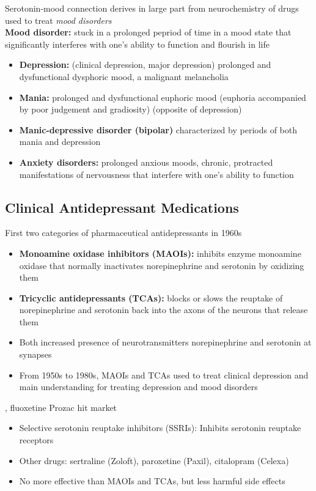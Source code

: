 \documentclass{article}
\begin{document}
Serotonin-mood connection derives in large part from neurochemistry of drugs used to treat \textit{mood disorders} \\

\noindent \textbf{Mood disorder:} stuck in a prolonged pepriod of time in a mood state that significantly interferes with one's ability to function and flourish in life 

\begin{itemize}
    \item \textbf{Depression:} (clinical depression, major depression) prolonged and dysfunctional dysphoric mood, a malignant melancholia
    \item \textbf{Mania:} prolonged and dysfunctional euphoric mood (euphoria accompanied by poor judgement and gradiosity) (opposite of depression) 
    \item \textbf{Manic-depressive disorder (bipolar)} characterized by periods of both mania and depression
    \item \textbf{Anxiety disorders:} prolonged anxious moods, chronic, protracted manifestations of nervousness that interfere with one's ability to function
\end{itemize}

\subsection{Clinical Antidepressant Medications}
First two categories of pharmaceutical antidepressants in 1960s
\begin{itemize}
    \item \textbf{Monoamine oxidase inhibitors (MAOIs):} inhibits enzyme monoamine oxidase that normally inactivates norepinephrine and serotonin by oxidizing them 
    \item \textbf{Tricyclic antidepressants (TCAs):} blocks or slows the reuptake of norepinephrine and serotonin back into the axons of the neurons that release them 
    \item Both increased presence of neurotransmitters norepinephrine and serotonin at synapses
    \item From 1950s to 1980s, MAOIs and TCAs used to treat clinical depression and main understanding for treating depression and mood disorders
\end{itemize}

, fluoxetine Prozac hit market
\begin{itemize}
    \item Selective serotonin reuptake inhibitors (SSRIs): Inhibits serotonin reuptake receptors
    \item Other drugs: sertraline (Zoloft), paroxetine (Paxil), citalopram (Celexa)
    \item No more effective than MAOIs and TCAs, but less harmful side effects
\end{itemize}
\end{document}
